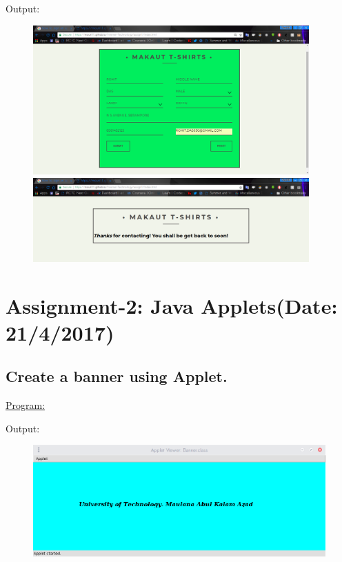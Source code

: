 \documentclass[a4paper,11pt]{article}
\begin{document}
Output:
\begin{figure}[H]
\centering
\includegraphics[width=300pt,height=\textheight,keepaspectratio]{../assign1/form1.png}
\includegraphics[width=300pt,height=\textheight,keepaspectratio]{../assign1/form2.png}
\end{figure}

\bigskip

\section{Assignment-2: Java Applets(Date: 21/4/2017)}
\subsection{Create a banner using Applet.}
\underline{Program:}


Output:
\begin{figure}[H]
\centering
\includegraphics[width=350pt,height=\textheight,keepaspectratio]{../assign2/pics/1.png}
\end{figure}
\end{document}
